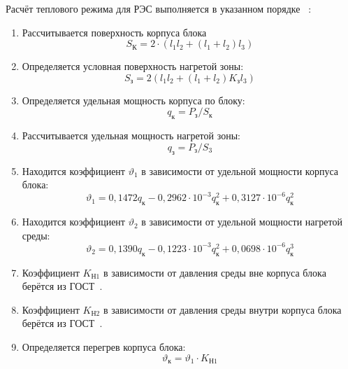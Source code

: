 Расчёт теплового режима для РЭС выполняется в указанном порядке
~\cite{Rotkop1976}:
\begin{enumerate}
\item Рассчитывается поверхность корпуса блока
  \begin{equation}
    S_{К} = 2 \cdot (l_1 l_2 + (l_1+ l_2)l_3) %
  \end{equation}

\item Определяется условная поверхность нагретой зоны:
  \begin{equation}
    S_{з} = 2 (l_1 l_2 + (l_1 + l_2) K_{з} l_3 ) %
  \end{equation}

\item Определяется удельная мощность корпуса по блоку:
%
\begin{equation}
  q_к = P_з/S_к %
\end{equation}
%
\item Рассчитывается удельная мощность нагретой зоны:
  \begin{equation}
      q_з = P_з/S_3 %
    \end{equation}

\item Находится коэффициент $\vartheta_1$ в зависимости от удельной мощности корпуса блока:
\begin{equation}
\vartheta_1 = 0,1472q_к - 0,2962 \cdot 10^{-3}q_к^2 + 0,3127 \cdot 10^{-6}q_к^2
\end{equation}

\item Находится коэффициент $\vartheta_2$ в зависимости от удельной мощности нагретой среды:
%
\begin{equation}
\vartheta_2 = 0,1390q_к - 0,1223 \cdot 10^{-3}q_к^2 + 0,0698 \cdot 10^{-6}q_к^3
\end{equation}

\item Коэффициент $K_{Н1}$ в зависимости от давления
  среды вне корпуса блока берётся из ГОСТ~\cite{GOST-15150-69}.

\item Коэффициент $K_{Н2}$ в зависимости от давления
  среды внутри корпуса блока берётся из ГОСТ~\cite{GOST-15150-69}.

\item Определяется перегрев корпуса блока:
%
  \begin{equation}
    \vartheta_к = \vartheta_1 \cdot K_{Н1}
  \end{equation}


\end{enumerate}
